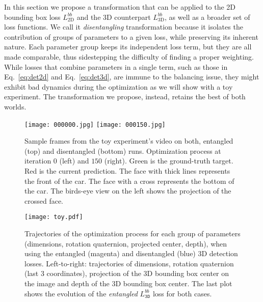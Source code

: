\documentclass[10pt,twocolumn,letterpaper]{article}
\begin{document}
In this section we propose a transformation that can be applied to the 2D bounding box loss $L_\text{2D}^{bb}$ and the 3D counterpart $L_\text{3D}^{bb}$, as well as a broader set of loss functions.
We call it \emph{disentangling} transformation because it isolates the contribution of groups of parameters to a given loss, while preserving its inherent nature. Each parameter group keeps its independent loss term, but they are all made comparable, thus sidestepping the difficulty of finding a proper weighting. While losses that combine parameters in a single term, such as those in Eq.~\eqref{eq:det2d} and Eq.~\eqref{eq:det3d}, are immune to the balancing issue, they might exhibit bad dynamics during the optimization as we will show with a toy experiment. The transformation we propose, instead, retains the best of both worlds.
\begin{figure*}[t]
    \centering
    \texttt{[image: 000000.jpg]}
    \texttt{[image: 000150.jpg]}
    \caption{Sample frames from the toy experiment's video on both, entangled (top) and disentangled (bottom) runs. Optimization process at iteration $0$ (left) and $150$ (right). Green is the ground-truth target. Red is the current prediction. The face with thick lines represents the front of the car. The face with a cross represents the bottom of the car. The birds-eye view on the left shows the projection of the crossed face.}
    \label{fig:video}
    \vspace{-10pt}
\end{figure*}
\begin{figure*}
    \centering
    \texttt{[image: toy.pdf]}
    \caption{Trajectories of the optimization process for each group of parameters (dimensions, rotation quaternion, projected center, depth), when using the entangled (magenta) and disentangled (blue) 3D detection losses. Left-to-right: trajectories of dimensions, rotation quaternion (last 3 coordinates), projection of the 3D bounding box center on the image and depth of the 3D bounding box center. The last plot shows the evolution of the \emph{entangled} $L_\mathtt{3D}^{bb}$ loss for both cases.   }
    \label{fig:toy}
    \vspace{-10pt}
\end{figure*}
\end{document}
